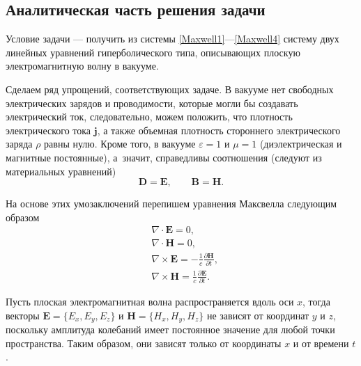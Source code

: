 \documentclass[12pt,a4paper]{article}
\begin{document}
	\subsection{Аналитическая часть решения задачи}
	Условие задачи --- получить из системы \eqref{Maxwell1}---\eqref{Maxwell4} систему двух линейных уравнений гиперболического типа, описывающих плоскую электромагнитную волну в вакууме.
	
	Сделаем ряд упрощений, соответствующих задаче. В вакууме нет свободных электрических зарядов и проводимости, которые могли бы создавать электрический ток, следовательно, можем положить, что плотность электрического тока $\mathbf{j}$, а также объемная плотность стороннего электрического заряда $\rho$ равны нулю. Кроме того, в вакууме $\varepsilon = 1$ и $\mu = 1$ (диэлектрическая и магнитные постоянные), а~значит, справедливы соотношения (следуют из материальных уравнений)
	\begin{equation}
		\mathbf{D} = \mathbf{E}, \qquad \mathbf{B} = \mathbf{H}.
	\end{equation}
	
	На основе этих умозаключений перепишем уравнения Максвелла следующим образом
	\begin{align}
		&\nabla \cdot \mathbf{E} = 0,\label{Maxw1}\\
		&\nabla \cdot \mathbf{H} = 0,\\
		&\nabla \times \mathbf{E} = -\frac{1}{c}\frac{\partial\mathbf{H}}{\partial t},\\
		&\nabla \times \mathbf{H} = \frac{1}{c}\frac{\partial\mathbf{E}}{\partial t}.\label{Maxw4}\
	\end{align}
	
	Пусть плоская электромагнитная волна распространяется вдоль оси $x$, тогда векторы $\mathbf{E} = \{E_x, E_y, E_z\}$ и $\mathbf{H} = \{H_x, H_y, H_z\}$ не зависят от координат $y$ и $z$, поскольку амплитуда колебаний имеет постоянное значение для любой точки пространства. Таким образом, они зависят только от координаты $x$ и от времени $t$.
	
\end{document}
